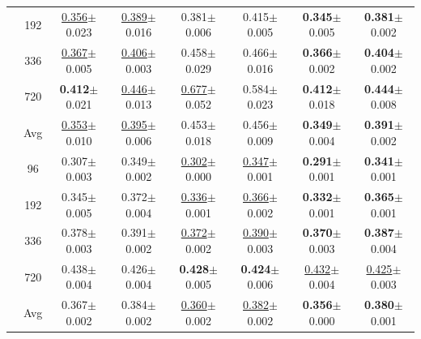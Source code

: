 \begin{table}[t]
{\begin{tabular}{c|c|cc|cc|cc}
 & 192 & \underline{0.356}{\scriptsize$\pm$0.023} & \underline{0.389}{\scriptsize$\pm$0.016} & 0.381{\scriptsize$\pm$0.006} & 0.415{\scriptsize$\pm$0.005} & \textbf{0.345}{\scriptsize$\pm$0.005} & \textbf{0.381}{\scriptsize$\pm$0.002} \\
 & 336 & \underline{0.367}{\scriptsize$\pm$0.005} & \underline{0.406}{\scriptsize$\pm$0.003} & 0.458{\scriptsize$\pm$0.029} & 0.466{\scriptsize$\pm$0.016} & \textbf{0.366}{\scriptsize$\pm$0.002} & \textbf{0.404}{\scriptsize$\pm$0.002} \\
 & 720 & \textbf{0.412}{\scriptsize$\pm$0.021} & \underline{0.446}{\scriptsize$\pm$0.013} & \underline{0.677}{\scriptsize$\pm$0.052} & 0.584{\scriptsize$\pm$0.023} & \textbf{0.412}{\scriptsize$\pm$0.018} & \textbf{0.444}{\scriptsize$\pm$0.008} \\
\cmidrule(lr){2-8}
 & Avg & \underline{0.353}{\scriptsize$\pm$0.010} & \underline{0.395}{\scriptsize$\pm$0.006} & 0.453{\scriptsize$\pm$0.018} & 0.456{\scriptsize$\pm$0.009} & \textbf{0.349}{\scriptsize$\pm$0.004} & \textbf{0.391}{\scriptsize$\pm$0.002} \\
\midrule
{} & 96 & 0.307{\scriptsize$\pm$0.003} & 0.349{\scriptsize$\pm$0.002} & \underline{0.302}{\scriptsize$\pm$0.000} & \underline{0.347}{\scriptsize$\pm$0.001} & \textbf{0.291}{\scriptsize$\pm$0.001} & \textbf{0.341}{\scriptsize$\pm$0.001} \\
 & 192 & 0.345{\scriptsize$\pm$0.005} & 0.372{\scriptsize$\pm$0.004} & \underline{0.336}{\scriptsize$\pm$0.001} & \underline{0.366}{\scriptsize$\pm$0.002} & \textbf{0.332}{\scriptsize$\pm$0.001} & \textbf{0.365}{\scriptsize$\pm$0.001} \\
 & 336 & 0.378{\scriptsize$\pm$0.003} & 0.391{\scriptsize$\pm$0.002} & \underline{0.372}{\scriptsize$\pm$0.002} & \underline{0.390}{\scriptsize$\pm$0.003} & \textbf{0.370}{\scriptsize$\pm$0.003} & \textbf{0.387}{\scriptsize$\pm$0.004} \\
 & 720 & 0.438{\scriptsize$\pm$0.004} & 0.426{\scriptsize$\pm$0.004} & \textbf{0.428}{\scriptsize$\pm$0.005} & \textbf{0.424}{\scriptsize$\pm$0.006} & \underline{0.432}{\scriptsize$\pm$0.004} & \underline{0.425}{\scriptsize$\pm$0.003} \\
\cmidrule(lr){2-8}
 & Avg & 0.367{\scriptsize$\pm$0.002} & 0.384{\scriptsize$\pm$0.002} & \underline{0.360}{\scriptsize$\pm$0.002} & \underline{0.382}{\scriptsize$\pm$0.002} & \textbf{0.356}{\scriptsize$\pm$0.000} & \textbf{0.380}{\scriptsize$\pm$0.001} \\

\end{tabular}}
\end{table}
